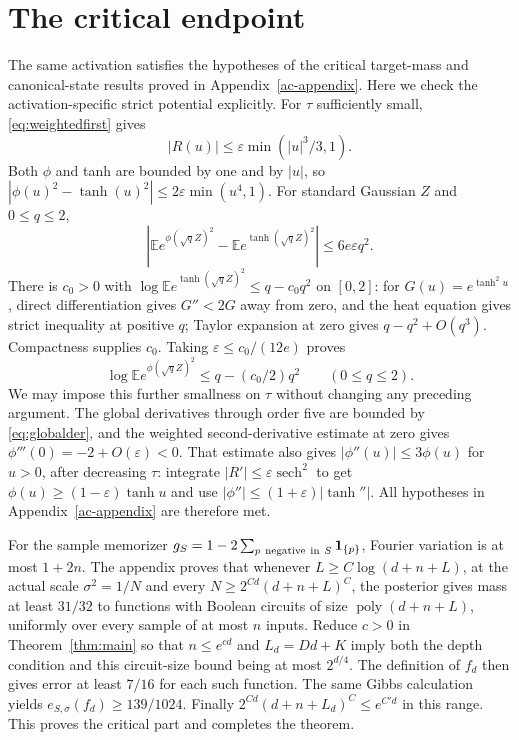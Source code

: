 \documentclass[11pt]{article}
\theoremstyle{remark}\newtheorem{remark}[theorem]{Remark}
\newcommand{\E}{\mathbb E}
\newcommand{\poly}{\operatorname{poly}}
\begin{document}
\section{The critical endpoint}
The same activation satisfies the hypotheses of the critical
target-mass and canonical-state results proved in
Appendix~\ref{ac-appendix}. Here we check the activation-specific
strict potential explicitly.
For $\tau$ sufficiently small, \eqref{eq:weightedfirst} gives
\[
 |R(u)|\le\varepsilon\min(|u|^3/3,1).
\]
Both $\phi$ and tanh are bounded by one and by $|u|$, so
$|\phi(u)^2-\tanh(u)^2|\le2\varepsilon\min(u^4,1)$.
For standard Gaussian $Z$ and $0\le q\le2$,
\[
 \left|\E e^{\phi(\sqrt qZ)^2}
             -\E e^{\tanh(\sqrt qZ)^2}\right|
       \le6e\varepsilon q^2.
\]
There is $c_0>0$ with
$\log\E e^{\tanh(\sqrt qZ)^2}\le q-c_0q^2$ on $[0,2]$:
for $G(u)=e^{\tanh^2u}$, direct differentiation gives
$G''<2G$ away from zero, and the heat equation gives strict
inequality at positive $q$; Taylor expansion at zero gives
$q-q^2+O(q^3)$. Compactness supplies $c_0$.
Taking $\varepsilon\le c_0/(12e)$ proves
\begin{equation}\label{eq:strictpotential}
 \log\E e^{\phi(\sqrt qZ)^2}\le q-(c_0/2)q^2
                         \qquad(0\le q\le2).
\end{equation}
We may impose this further smallness on $\tau$ without changing
any preceding argument.
The global derivatives through order five are bounded by
\eqref{eq:globalder}, and the weighted second-derivative estimate
at zero gives $\phi'''(0)=-2+O(\varepsilon)<0$.
That estimate
also gives $|\phi''(u)|\le3\phi(u)$ for $u>0$, after decreasing
$\tau$: integrate $|R'|\le\varepsilon\operatorname{sech}^2$
to get $\phi(u)\ge(1-\varepsilon)\tanh u$ and use
$|\phi''|\le(1+\varepsilon)|\tanh''|$.
All hypotheses in Appendix~\ref{ac-appendix} are therefore met.

For the sample memorizer
$g_S=1-2\sum_{p\ {\rm negative\ in}\ S}\mathbf1_{\{p\}}$,
Fourier variation is at most $1+2n$.
The appendix proves that whenever $L\ge C\log(d+n+L)$,
at the actual scale $\sigma^2=1/N$ and every
$N\ge2^{Cd}(d+n+L)^C$, the posterior gives mass at least
$31/32$ to functions with Boolean circuits of size
$\poly(d+n+L)$, uniformly over every sample of at most $n$
inputs.
Reduce $c>0$ in Theorem~\ref{thm:main} so that
$n\le e^{cd}$ and $L_d=Dd+K$ imply both the depth condition
and this circuit-size bound being at most $2^{d/4}$.
The definition of $f_d$ then gives error at least $7/16$
for each such function. The same Gibbs calculation yields
$e_{S,\sigma}(f_d)\ge139/1024$.
Finally $2^{Cd}(d+n+L_d)^C\le e^{C'd}$ in this range.
This proves the critical part and completes the theorem.
\end{document}
